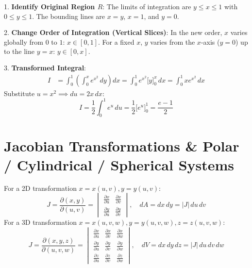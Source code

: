 \begin{solutionbox}
1. \textbf{Identify Original Region $R$}:
The limits of integration are $y \le x \le 1$ with $0 \le y \le 1$.
The bounding lines are $x = y$, $x = 1$, and $y = 0$.

2. \textbf{Change Order of Integration (Vertical Slices)}:
In the new order, $x$ varies globally from $0$ to $1$: $x \in [0, 1]$.
For a fixed $x$, $y$ varies from the $x$-axis ($y = 0$) up to the line $y = x$: $y \in [0, x]$.

3. \textbf{Transformed Integral}:
\begin{align}
I &= \int_0^1 \left( \int_0^x e^{x^2}\,dy \right) dx = \int_0^1 e^{x^2} \Big[ y \Big]_0^x \, dx = \int_0^1 x e^{x^2}\,dx
\end{align}
Substitute $u = x^2 \implies du = 2x\,dx$:
\begin{equation}
I = \frac{1}{2} \int_0^1 e^u\,du = \frac{1}{2} \Big[ e^u \Big]_0^1 = \frac{e - 1}{2}
\end{equation}
\end{solutionbox}

\section{Jacobian Transformations \& Polar / Cylindrical / Spherical Systems}

\begin{definition}
For a 2D transformation $x = x(u,v), y = y(u,v)$:
\begin{equation}
J = \frac{\partial(x,y)}{\partial(u,v)} = \begin{vmatrix}
\frac{\partial x}{\partial u} & \frac{\partial x}{\partial v} \\
\frac{\partial y}{\partial u} & \frac{\partial y}{\partial v}
\end{vmatrix}, \quad dA = dx\,dy = |J|\,du\,dv
\end{equation}
For a 3D transformation $x = x(u,v,w), y = y(u,v,w), z = z(u,v,w)$:
\begin{equation}
J = \frac{\partial(x,y,z)}{\partial(u,v,w)} = \begin{vmatrix}
\frac{\partial x}{\partial u} & \frac{\partial x}{\partial v} & \frac{\partial x}{\partial w} \\
\frac{\partial y}{\partial u} & \frac{\partial y}{\partial v} & \frac{\partial y}{\partial w} \\
\frac{\partial z}{\partial u} & \frac{\partial z}{\partial v} & \frac{\partial z}{\partial w}
\end{vmatrix}, \quad dV = dx\,dy\,dz = |J|\,du\,dv\,dw
\end{equation}
\end{definition}

